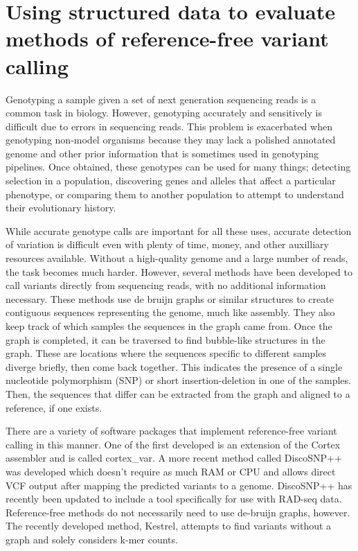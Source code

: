 \chapter{Using structured data to evaluate methods of reference-free variant calling}
\label{ch:structured}

Genotyping a sample given a set of next generation sequencing reads is a common task in biology. However, genotyping accurately and sensitively is difficult due to errors in sequencing reads. This problem is exacerbated when genotyping non-model organisms because they may lack a polished annotated genome and other prior information that is sometimes used in genotyping pipelines. Once obtained, these genotypes can be used for many things; detecting selection in a population, discovering genes and alleles that affect a particular phenotype, or comparing them to another population to attempt to understand their evolutionary history.

While accurate genotype calls are important for all these uses, accurate detection of variation is difficult even with plenty of time, money, and other auxilliary resources available. Without a high-quality genome and a large number of reads, the task becomes much harder. However, several methods have been developed to call variants directly from sequencing reads, with no additional information necessary. These methods use de bruijn graphs or similar structures to create contiguous sequences representing the genome, much like assembly. They also keep track of which samples the sequences in the graph came from. Once the graph is completed, it can be traversed to find bubble-like structures in the graph. These are locations where the sequences specific to different samples diverge briefly, then come back together. This indicates the presence of a single nucleotide polymorphism (SNP) or short insertion-deletion in one of the samples. Then, the sequences that differ can be extracted from the graph and aligned to a reference, if one exists.

There are a variety of software packages that implement reference-free variant calling in this manner. One of the first developed is an extension of the Cortex assembler and is called cortex\_var. A more recent method called DiscoSNP++ was developed which doesn't require as much RAM or CPU and allows direct VCF output after mapping the predicted variants to a genome. DiscoSNP++ has recently been updated to include a tool specifically for use with RAD-seq data. Reference-free methods do not necessarily need to use de-bruijn graphs, however. The recently developed method, Kestrel, attempts to find variants without a graph and solely considers k-mer counts. %

